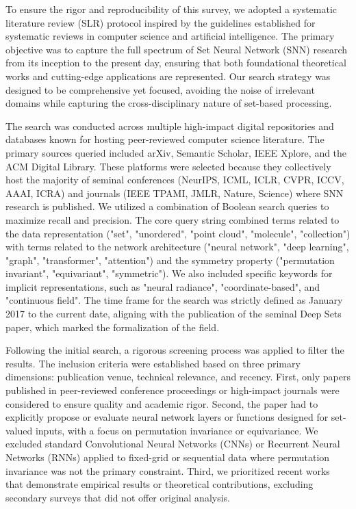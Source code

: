 \documentclass{article}
\begin{document}
\label{sec:methodology}

To ensure the rigor and reproducibility of this survey, we adopted a systematic literature review (SLR) protocol inspired by the guidelines established for systematic reviews in computer science and artificial intelligence. The primary objective was to capture the full spectrum of Set Neural Network (SNN) research from its inception to the present day, ensuring that both foundational theoretical works and cutting-edge applications are represented. Our search strategy was designed to be comprehensive yet focused, avoiding the noise of irrelevant domains while capturing the cross-disciplinary nature of set-based processing.

The search was conducted across multiple high-impact digital repositories and databases known for hosting peer-reviewed computer science literature. The primary sources queried included arXiv, Semantic Scholar, IEEE Xplore, and the ACM Digital Library. These platforms were selected because they collectively host the majority of seminal conferences (NeurIPS, ICML, ICLR, CVPR, ICCV, AAAI, ICRA) and journals (IEEE TPAMI, JMLR, Nature, Science) where SNN research is published. We utilized a combination of Boolean search queries to maximize recall and precision. The core query string combined terms related to the data representation ("set", "unordered", "point cloud", "molecule", "collection") with terms related to the network architecture ("neural network", "deep learning", "graph", "transformer", "attention") and the symmetry property ("permutation invariant", "equivariant", "symmetric"). We also included specific keywords for implicit representations, such as "neural radiance", "coordinate-based", and "continuous field". The time frame for the search was strictly defined as January 2017 to the current date, aligning with the publication of the seminal Deep Sets paper, which marked the formalization of the field.

Following the initial search, a rigorous screening process was applied to filter the results. The inclusion criteria were established based on three primary dimensions: publication venue, technical relevance, and recency. First, only papers published in peer-reviewed conference proceedings or high-impact journals were considered to ensure quality and academic rigor. Second, the paper had to explicitly propose or evaluate neural network layers or functions designed for set-valued inputs, with a focus on permutation invariance or equivariance. We excluded standard Convolutional Neural Networks (CNNs) or Recurrent Neural Networks (RNNs) applied to fixed-grid or sequential data where permutation invariance was not the primary constraint. Third, we prioritized recent works that demonstrate empirical results or theoretical contributions, excluding secondary surveys that did not offer original analysis.
\end{document}
